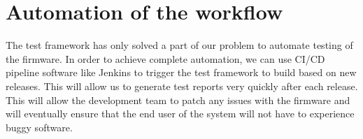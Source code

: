 \section{Automation of the workflow}
The test framework has only solved a part of our problem to automate testing of the firmware.
In order to achieve complete automation, we can use CI/CD pipeline software like Jenkins \cite{jenkins} to trigger the test framework to build based on new releases.
This will allow us to generate test reports very quickly after each release. This will allow the development team to patch any issues with the firmware and will eventually ensure that the end user of the system will not have to experience buggy software.

